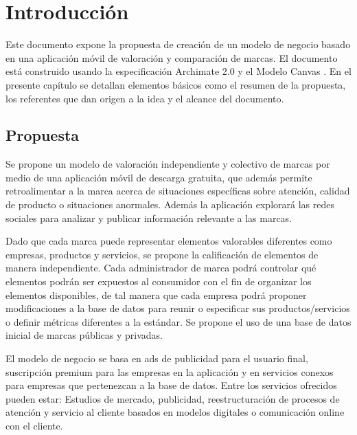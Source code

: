 
\chapter{Introducción}

Este documento expone la propuesta de creación de un modelo de negocio basado en una aplicación móvil de valoración y comparación de marcas. El documento está construido usando la especificación Archimate 2.0 \cite{iacob2012archimate} y el Modelo Canvas \cite{osterwalder2013business}\cite{osterwalder2004business}. En el presente capítulo se detallan elementos básicos como el resumen de la propuesta, los referentes que dan origen a la idea y el alcance del documento.

\section{Propuesta}

Se propone un modelo de valoración independiente y colectivo de marcas por medio de una aplicación móvil de descarga gratuita, que además permite retroalimentar a la marca acerca de situaciones específicas sobre atención, calidad de producto o situaciones anormales. Además la aplicación explorará las redes sociales para analizar y publicar información relevante a las marcas.

Dado que cada marca puede representar elementos valorables diferentes como empresas, productos y servicios, se propone la calificación de elementos de manera independiente. Cada administrador de marca podrá controlar qué elementos podrán ser expuestos al consumidor con el fin de organizar los elementos disponibles, de tal manera que cada empresa podrá proponer modificaciones a la base de datos para reunir o especificar sus productos/servicios o definir métricas diferentes a la estándar. Se propone el uso de una base de datos inicial de marcas públicas y privadas.

El modelo de negocio se basa en ads de publicidad para el usuario final, suscripción premium para las empresas en la aplicación y en servicios conexos para empresas que pertenezcan a la base de datos. Entre los servicios ofrecidos pueden estar: Estudios de mercado, publicidad, reestructuración de procesos de atención y servicio al cliente basados en modelos digitales o comunicación online con el cliente.

